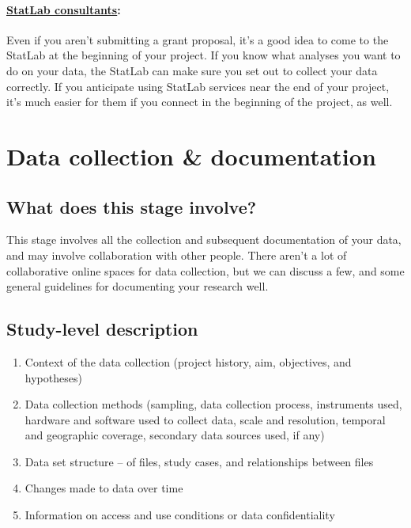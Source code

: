\documentclass[]{article}
\begin{document}
\paragraph{\href{http://csssi.yale.edu/csssi-statistical-consultants-schedule}{StatLab
consultants}:}\label{statlab-consultants}

Even if you aren't submitting a grant proposal, it's a good idea to come
to the StatLab at the beginning of your project. If you know what
analyses you want to do on your data, the StatLab can make sure you set
out to collect your data correctly. If you anticipate using StatLab
services near the end of your project, it's much easier for them if you
connect in the beginning of the project, as well.

\section{Data collection \&
documentation}\label{data-collection-documentation}

\subsection{What does this stage
involve?}\label{what-does-this-stage-involve-1}

This stage involves all the collection and subsequent documentation of
your data, and may involve collaboration with other people. There aren't
a lot of collaborative online spaces for data collection, but we can
discuss a few, and some general guidelines for documenting your research
well.

\subsection{Study-level description}\label{study-level-description}

\begin{enumerate}
\def\labelenumi{\arabic{enumi}.}
\itemsep1pt\parskip0pt
\item
  Context of the data collection (project history, aim, objectives, and
  hypotheses)
\item
  Data collection methods (sampling, data collection process,
  instruments used, hardware and software used to collect data, scale
  and resolution, temporal and geographic coverage, secondary data
  sources used, if any)
\item
  Data set structure -- of files, study cases, and relationships between
  files
\item
  Changes made to data over time
\item
  Information on access and use conditions or data confidentiality
\end{enumerate}
\end{document}
